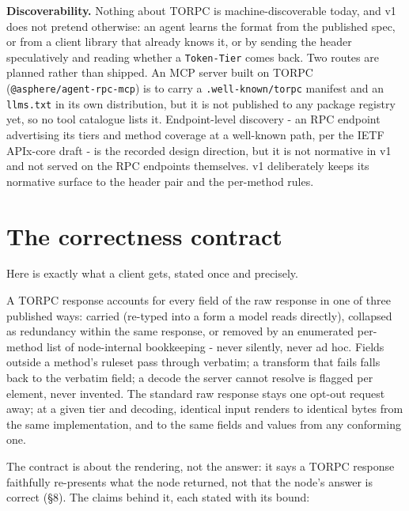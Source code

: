 \documentclass[11pt]{article}
\newcommand{\code}[1]{\texttt{#1}}
\begin{document}
\textbf{Discoverability.} Nothing about TORPC is machine-discoverable today, and v1 does not pretend otherwise: an agent learns the format from the published spec, or from a client library that already knows it, or by sending the header speculatively and reading whether a \code{Token-Tier} comes back. Two routes are planned rather than shipped. An MCP server built on TORPC (\code{@asphere/agent-rpc-mcp}) is to carry a \code{.well-known/torpc} manifest and an \code{llms.txt} in its own distribution, but it is not published to any package registry yet, so no tool catalogue lists it. Endpoint-level discovery - an RPC endpoint advertising its tiers and method coverage at a well-known path, per the IETF APIx-core draft \cite{apix} - is the recorded design direction, but it is not normative in v1 and not served on the RPC endpoints themselves. v1 deliberately keeps its normative surface to the header pair and the per-method rules.

\section{The correctness contract}

Here is exactly what a client gets, stated once and precisely.

\begin{guaranteebox}
A TORPC response accounts for every field of the raw response in one of three published ways: carried (re-typed into a form a model reads directly), collapsed as redundancy within the same response, or removed by an enumerated per-method list of node-internal bookkeeping - never silently, never ad hoc. Fields outside a method's ruleset pass through verbatim; a transform that fails falls back to the verbatim field; a decode the server cannot resolve is flagged per element, never invented. The standard raw response stays one opt-out request away; at a given tier and decoding, identical input renders to identical bytes from the same implementation, and to the same fields and values from any conforming one.
\end{guaranteebox}

The contract is about the rendering, not the answer: it says a TORPC response faithfully re-presents what the node returned, not that the node's answer is correct (\S8). The claims behind it, each stated with its bound:
\end{document}
